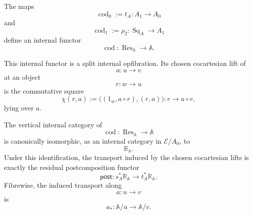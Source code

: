 \begin{theorem}
    The maps
    \[
        \operatorname{cod}_0
        :=
        t_A:A_1\to A_0
    \]
    and
    \[
        \operatorname{cod}_1
        :=
        \rho_2:
        \operatorname{Sq}_A\to A_1
    \]
    define an internal functor
    \[
        \operatorname{cod}:
        \operatorname{Res}_{\mathbb A}
        \longrightarrow
        \mathbb A.
    \]

    This internal functor is a split internal opfibration. Its chosen
    cocartesian lift of
    \[
        a:u\to v
    \]
    at an object
    \[
        r:w\to u
    \]
    is the commutative square
    \[
        \chi(r,a)
        :=
        \bigl(
            (1_w,a\circ r),
            (r,a)
        \bigr):
        r\longrightarrow a\circ r,
    \]
    lying over \(a\).

    The vertical internal category of
    \[
        \operatorname{cod}:
        \operatorname{Res}_{\mathbb A}\to\mathbb A
    \]
    is canonically isomorphic, as an internal category in
    \(\mathcal E/A_0\), to
    \[
        \mathbb R_{\mathbb A}.
    \]
    Under this identification, the transport induced by the chosen
    cocartesian lifts is exactly the residual postcomposition functor
    \[
        \mathsf{post}:
        s_A^*\mathbb R_{\mathbb A}
        \longrightarrow
        t_A^*\mathbb R_{\mathbb A}.
    \]
    Fibrewise, the induced transport along
    \[
        a:u\to v
    \]
    is
    \[
        a_*:\mathbb A/u\to\mathbb A/v.
    \]
\end{theorem}
